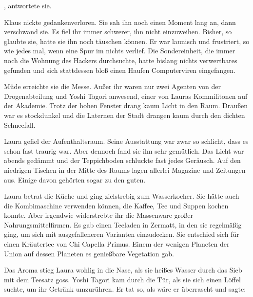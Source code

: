\par

, antwortete sie. 

\par

Klaus nickte gedankenverloren. Sie sah ihn noch einen Moment lang an, dann verschwand sie. Es fiel ihr immer schwerer, ihn nicht einzuweihen. Bisher, so glaubte sie, hatte sie ihn noch täuschen können. Er war launisch und frustriert, so wie jedes mal, wenn eine Spur im nichts verlief. Die Sondereinheit, die immer noch die Wohnung des Hackers durchsuchte, hatte bislang nichts verwertbares gefunden und sich stattdessen bloß einen Haufen Computerviren eingefangen.

\par

Müde erreichte sie die Messe. Außer ihr waren nur zwei Agenten von der Drogenabteilung und Yoshi Tagori anwesend, einer von Lauras Kommilitonen auf der Akademie. Trotz der hohen Fenster drang kaum Licht in den Raum. Draußen war es stockdunkel und die Laternen der Stadt drangen kaum durch den dichten Schneefall.

\par

Laura gefiel der Aufenthaltsraum. Seine Ausstattung war zwar so schlicht, dass es schon fast traurig war. Aber dennoch fand sie ihn sehr gemütlich. Das Licht war abends gedämmt und der Teppichboden schluckte fast jedes Geräusch. Auf den niedrigen Tischen in der Mitte des Raums lagen allerlei Magazine und Zeitungen aus. Einige davon gehörten sogar zu den guten.

\par

Laura betrat die Küche und ging zielstrebig zum Wasserkocher. Sie hätte auch die Kombimaschine verwenden können, die Kaffee, Tee und Suppen kochen konnte. Aber irgendwie widerstrebte ihr die Massenware großer Nahrungsmittelfirmen. Es gab einen Teeladen in Zermatt, in den sie regelmäßig ging, um sich mit ausgefalleneren Varianten einzudecken. Sie entschied sich für einen Kräutertee von Chi Capella Primus. Einem der wenigen Planeten der Union auf dessen Planeten es genießbare Vegetation gab.

\par

Das Aroma stieg Laura wohlig in die Nase, als sie heißes Wasser durch das Sieb mit dem Teesatz goss. Yoshi Tagori kam durch die Tür, als sie sich einen Löffel suchte, um ihr Getränk umzurühren. Er tat so, als wäre er überrascht und sagte: 

